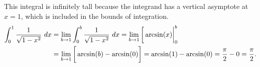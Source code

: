 \documentclass[10pt]{article}
\newenvironment{red}{\color{red}}{\ignorespacesafterend}
\begin{document}
\begin{enumerate}[leftmargin=0pt]
\begin{enumerate}
    \begin{red}
    This integral is infinitely tall because the integrand has a vertical asymptote at $x=1$, which is included in the bounds of integration. 
    \begin{align*}
        \int_0^1\frac{1}{\sqrt{1-x^2}}\ dx 
        &= \lim_{b\to 1} \int_0^b \frac{1}{\sqrt{1-x^2}}\ dx = \lim_{b\to 1}\left[\vphantom\int \arcsin(x)\right|_0^b \\
        &= \lim_{b\to 1} \left[\vphantom\int \arcsin(b) - \arcsin(0) \right] 
        = \arcsin(1) - \arcsin(0) = \frac{\pi}{2} - 0 = \frac{\pi}{2}.
    \end{align*}
    \end{red}
\end{enumerate}

\end{enumerate}
\end{document}

